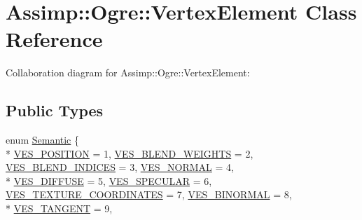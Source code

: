 \hypertarget{class_assimp_1_1_ogre_1_1_vertex_element}{\section{Assimp\+:\+:Ogre\+:\+:Vertex\+Element Class Reference}
\label{class_assimp_1_1_ogre_1_1_vertex_element}
}


Collaboration diagram for Assimp\+:\+:Ogre\+:\+:Vertex\+Element\+:
\subsection*{Public Types}
\begin{DoxyCompactItemize}
\item 
enum \hyperlink{class_assimp_1_1_ogre_1_1_vertex_element_a34497be6620a9ecece6ff193a044d6bb}{Semantic} \{ \\*
\hyperlink{class_assimp_1_1_ogre_1_1_vertex_element_a34497be6620a9ecece6ff193a044d6bba120d3c628c61bfa9ad7fac972262b269}{V\+E\+S\+\_\+\+P\+O\+S\+I\+T\+I\+O\+N} = 1, 
\hyperlink{class_assimp_1_1_ogre_1_1_vertex_element_a34497be6620a9ecece6ff193a044d6bba10f0ac0fb42a9affc3df01426d9817bc}{V\+E\+S\+\_\+\+B\+L\+E\+N\+D\+\_\+\+W\+E\+I\+G\+H\+T\+S} = 2, 
\hyperlink{class_assimp_1_1_ogre_1_1_vertex_element_a34497be6620a9ecece6ff193a044d6bbacf58b2d2b9c32b180e2d147324219693}{V\+E\+S\+\_\+\+B\+L\+E\+N\+D\+\_\+\+I\+N\+D\+I\+C\+E\+S} = 3, 
\hyperlink{class_assimp_1_1_ogre_1_1_vertex_element_a34497be6620a9ecece6ff193a044d6bbac275d64b6500659230e3cf50a29407d1}{V\+E\+S\+\_\+\+N\+O\+R\+M\+A\+L} = 4, 
\\*
\hyperlink{class_assimp_1_1_ogre_1_1_vertex_element_a34497be6620a9ecece6ff193a044d6bba72456905a480185d6761c5a40446e356}{V\+E\+S\+\_\+\+D\+I\+F\+F\+U\+S\+E} = 5, 
\hyperlink{class_assimp_1_1_ogre_1_1_vertex_element_a34497be6620a9ecece6ff193a044d6bba02de2f59e53ac097017cb342dccb08ae}{V\+E\+S\+\_\+\+S\+P\+E\+C\+U\+L\+A\+R} = 6, 
\hyperlink{class_assimp_1_1_ogre_1_1_vertex_element_a34497be6620a9ecece6ff193a044d6bba57688fd378ccc2dfb4c59f596fc96913}{V\+E\+S\+\_\+\+T\+E\+X\+T\+U\+R\+E\+\_\+\+C\+O\+O\+R\+D\+I\+N\+A\+T\+E\+S} = 7, 
\hyperlink{class_assimp_1_1_ogre_1_1_vertex_element_a34497be6620a9ecece6ff193a044d6bba401f2a05a2958db48cecbbf0bc500c09}{V\+E\+S\+\_\+\+B\+I\+N\+O\+R\+M\+A\+L} = 8, 
\\*
\hyperlink{class_assimp_1_1_ogre_1_1_vertex_element_a34497be6620a9ecece6ff193a044d6bbaaef6ad7dbda02e23b29c08b98d2aef3e}{V\+E\+S\+\_\+\+T\+A\+N\+G\+E\+N\+T} = 9, 

\end{DoxyCompactItemize}
